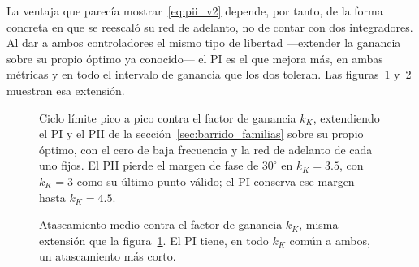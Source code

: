 La ventaja que parecía mostrar~\eqref{eq:pii_v2} depende, por tanto, de la forma concreta en que se reescaló su red de adelanto, no de contar con dos integradores. Al dar a ambos controladores el mismo tipo de libertad ---extender la ganancia sobre su propio óptimo ya conocido--- el PI es el que mejora más, en ambas métricas y en todo el intervalo de ganancia que los dos toleran. Las figuras~\ref{fig:extension_ciclo} y~\ref{fig:extension_atasco} muestran esa extensión.

\begin{figure}[ht]
    \centering
    
    \caption[Ciclo límite al extender la ganancia]{Ciclo límite pico a pico contra el factor de ganancia $k_K$, extendiendo el PI y el PII de la sección~\ref{sec:barrido_familias} sobre su propio óptimo, con el cero de baja frecuencia y la red de adelanto de cada uno fijos. El PII pierde el margen de fase de $30^\circ$ en $k_K=3.5$, con $k_K=3$ como su último punto válido; el PI conserva ese margen hasta $k_K=4.5$.}
    \label{fig:extension_ciclo}
\end{figure}

\begin{figure}[ht]
    \centering
    
    \caption[Atascamiento al extender la ganancia]{Atascamiento medio contra el factor de ganancia $k_K$, misma extensión que la figura~\ref{fig:extension_ciclo}. El PI tiene, en todo $k_K$ común a ambos, un atascamiento más corto.}
    \label{fig:extension_atasco}
\end{figure}

